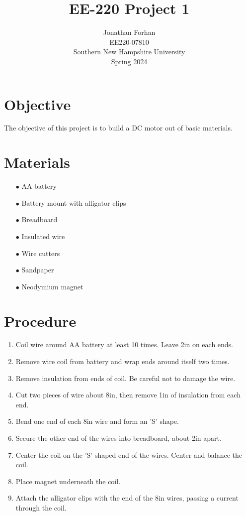 \documentclass[12pt]{article}
\title{EE-220 Project 1}
\author{Jonathan Forhan\\ EE220-07810\\ Southern New Hampshire University\\ Spring 2024}
\date{ }
\begin{document}
\maketitle
\tableofcontents
\thispagestyle{empty}
\clearpage

\section{Objective}

The objective of this project is to build a DC motor out of basic materials.

\section{Materials}

\begin{enumerate}
	\item[$\bullet$] AA battery
	\item[$\bullet$] Battery mount with alligator clips
	\item[$\bullet$] Breadboard
	\item[$\bullet$] Insulated wire
	\item[$\bullet$] Wire cutters
	\item[$\bullet$] Sandpaper
	\item[$\bullet$] Neodymium magnet
\end{enumerate}

\section{Procedure}

\begin{enumerate}
	\item Coil wire around AA battery at least 10 times. Leave 2in on each ends.
	\item Remove wire coil from battery and wrap ends around itself two times.
	\item Remove insulation from ends of coil. Be careful not to damage the wire.
	\item Cut two pieces of wire about 8in, then remove 1in of insulation from each end.
	\item Bend one end of each 8in wire and form an 'S' shape.
	\item Secure the other end of the wires into breadboard, about 2in apart.
	\item Center the coil on the 'S' shaped end of the wires. Center and balance the coil.
	\item Place magnet underneath the coil.
	\item Attach the alligator clips with the end of the 8in wires, passing a current through the coil.
\end{enumerate}
\end{document}
